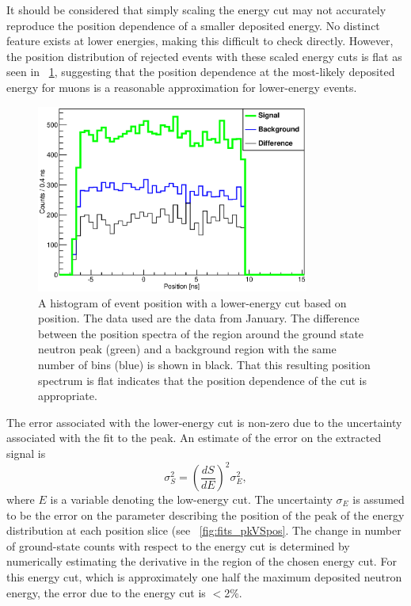It should be considered that simply scaling the energy cut may not accurately reproduce the position dependence of a smaller deposited energy.  No distinct feature exists at lower energies, making this difficult to check directly.  However, the position distribution of rejected events with these scaled energy cuts is flat as seen in {\fig}~\ref{fig:flatPositionSpectrum}, suggesting that the position dependence at the most-likely deposited energy for muons is a reasonable approximation for lower-energy events.
\begin{figure}[!htbp]
\centering
\includegraphics[width=0.8\textwidth]{figures/PositionSpectrum2.eps}
\caption[Testing the validity of the scaled low-energy position cut with position spectra from \MgReaction.]{A histogram of event position with a lower-energy cut based on position.  The data used are the \MgReaction data from January.  The difference between the position spectra of the region around the ground state neutron peak (green) and a background region with the same number of bins (blue) is shown in black.  That this resulting position spectrum is flat indicates that the position dependence of the cut is appropriate.}
\label{fig:flatPositionSpectrum}
\end{figure}

The error associated with the lower-energy cut is non-zero due to the uncertainty associated with the fit to the peak.  An estimate of the error on the extracted signal is
\begin{equation}
\sigma_S^2 = \left( \frac{dS}{dE} \right)^2 \sigma_E^2, 
\end{equation}
where $E$ is a variable denoting the low-energy cut.  The uncertainty $\sigma_E$ is assumed to be the error on the parameter describing the position of the peak of the energy distribution at each position slice (see {\fig}~\ref{fig:fits_pkVSpos}.  The change in number of ground-state counts with respect to the energy cut is determined by numerically estimating the derivative in the region of the chosen energy cut.  For this energy cut, which is approximately one half the maximum deposited neutron energy, the error due to the energy cut is $<$2\%.


